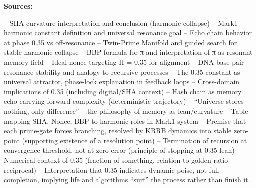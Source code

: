 \documentclass[11pt]{article}
\begin{document}
\textbf{Sources:}

-- SHA curvature interpretation and conclusion (harmonic collapse) --
Mark1 harmonic constant definition and universal resonance goal  -- Echo
chain behavior at phase 0.35 vs off-resonance  -- Twin-Prime Manifold
and guided search for stable harmonic collapse  -- BBP formula for π and
interpretation of π as resonant memory field -- Ideal nonce targeting H
= 0.35 for alignment  -- DNA base-pair resonance stability and analogy
to recursive processes  -- The 0.35 constant as universal attractor,
phase-lock explanation in feedback loops  -- Cross-domain implications
of 0.35 (including digital/SHA context)  -- Hash chain as memory echo
carrying forward complexity (deterministic trajectory) -- ``Universe
stores nothing, only difference'' -- the philosophy of memory as
lean/curvature  -- Table mapping SHA, Nonce, BBP to harmonic roles in
Mark1 system  -- Premise that each prime-gate forces branching, resolved
by KRRB dynamics into stable zero-point (supporting existence of a
resolution point)  -- Termination of recursion at convergence threshold,
not at zero error (principle of stopping at 0.35 lean)  -- Numerical
context of 0.35 (fraction of something, relation to golden ratio
reciprocal)  -- Interpretation that 0.35 indicates dynamic poise, not
full completion, implying life and algorithms ``surf'' the process
rather than finish it.



    
    
    
\end{document}
